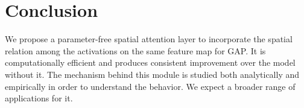 \documentclass[10pt,twocolumn,letterpaper]{article}
\begin{document}
\section{Conclusion}
We propose a parameter-free spatial attention layer to incorporate the spatial relation among the activations on the same feature map for GAP. It is computationally efficient and produces consistent improvement over the model without it. The mechanism behind this module is studied both analytically and empirically in order to understand the behavior. We expect a broader range of applications for it.





















  
\end{document}
